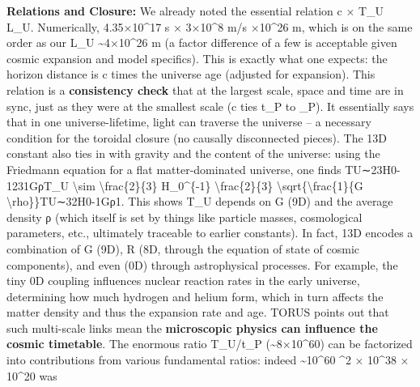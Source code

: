 \documentclass[
]{article}
\begin{document}
\textbf{Relations and Closure:} We already noted the essential relation
c × T\_U \approx L\_U\hspace{0pt}. Numerically, 4.35×10\^{}17 s × 3×10\^{}8
m/s ×10\^{}26 m, which is on the same order as our L\_U
\textasciitilde4×10\^{}26 m (a factor difference of a few is acceptable
given cosmic expansion and model specifics)\hspace{0pt}. This is exactly
what one expects: the horizon distance is c times the universe age
(adjusted for expansion). This relation is a \textbf{consistency check}
that at the largest scale, space and time are in sync, just as they were
at the smallest scale (c ties t\_P to \ell\_P). It essentially says that in
one universe-lifetime, light can traverse the universe -- a necessary
condition for the toroidal closure (no causally disconnected
pieces)\hspace{0pt}. The 13D constant also ties in with gravity and the
content of the universe: using the Friedmann equation for a flat
matter-dominated universe, one finds TU∼23H0-1\approx231GρT\_U
\textbackslash sim \textbackslash frac\{2\}\{3\} H\_0\^{}\{-1\} \approx
\textbackslash frac\{2\}\{3\}
\textbackslash sqrt\{\textbackslash frac\{1\}\{G
\textbackslash rho\}\}TU\hspace{0pt}∼32\hspace{0pt}H0-1\hspace{0pt}\hspace{0pt}Gρ1\hspace{0pt}\hspace{0pt}\hspace{0pt}.
This shows T\_U depends on G (9D) and the average density ρ (which
itself is set by things like particle masses, cosmological parameters,
etc., ultimately traceable to earlier constants). In fact, 13D encodes a
combination of G (9D), R (8D, through the equation of state of cosmic
components), and even \alpha (0D) through astrophysical
processes\hspace{0pt}. For example, the tiny 0D coupling \alpha influences
nuclear reaction rates in the early universe, determining how much
hydrogen and helium form, which in turn affects the matter density and
thus the expansion rate and age. TORUS points out that such multi-scale
links mean the \textbf{microscopic physics can influence the cosmic
timetable}. The enormous ratio T\_U/t\_P (\textasciitilde8×10\^{}60) can
be factorized into contributions from various fundamental ratios: indeed
\textasciitilde10\^{}60 \^{}2 × 10\^{}38 × 10\^{}20 was
\end{document}
